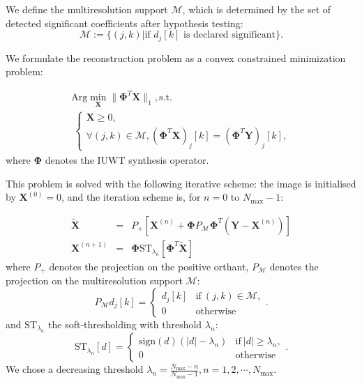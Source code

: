 We define the multiresolution support $\mathcal{M}$, which is determined by the set of detected significant coefficients after hypothesis testing:
\begin{equation}
\label{eq33}
\mathcal{M} := \{ (j,k) | \text{if } d_j[k] \text{ is declared significant} \} .
\end{equation}

We formulate the reconstruction problem as a convex constrained minimization problem:

\begin{equation}
\label{eq34}
\begin{split}
\text{Arg} \min_{\mathbf{X}} \| \mathbf{ \Phi}^{T}\mathbf{X}\|_1,
\text{s.t.} \\ \: \left\{\begin{array}{c}\mathbf{X} \geqslant 0 , \\\forall (j,k)\in \mathcal{M},      (\mathbf{ \Phi}^{T}\mathbf{X})_j[k]=(\mathbf{ \Phi}^{T}\mathbf{Y})_j[k] , \end{array}\right.
\end{split}
\end{equation}
where $\mathbf{\Phi}$ denotes the IUWT synthesis operator.

This problem is solved with the following iterative scheme: the image is initialised by $\mathbf{X}^{(0)} = 0$, and the iteration scheme is, for $n=0$ to $N_{\max}-1$:


\begin{eqnarray}
\tilde{\mathbf{X}} &=& P_{+}[\mathbf{ X}^{(n)} + \mathbf{ \Phi} P_{\mathcal{M}} \mathbf{ \Phi}^{T} (\mathbf{ Y} - \mathbf{ X}^{(n)})] \\
\mathbf{X}^{(n+1)} &=& \mathbf{ \Phi}\text{ST}_{\lambda_n}[\mathbf{ \Phi}^{T}\tilde{\mathbf{X}}]
\end{eqnarray}
where $P_{+}$ denotes the projection on the positive orthant, $P_{\mathcal{M}}$ denotes the projection on the multiresolution support $\mathcal{M}$:
\begin{equation}
P_{\mathcal{M}}d_j[k] = \left\{\begin{array}{cc} d_j[k] & \text{if} \  (j,k) \in \mathcal{M} , \\0 & \text{otherwise} \end{array} . \right.
\end{equation}
and $\text{ST}_{\lambda_n}$ the soft-thresholding with threshold $\lambda_n$:
\begin{equation}
\text{ST}_{\lambda_n} [d] = \left\{\begin{array}{cc} \mathrm{sign}(d)(|d| - \lambda_n) & \text{if} \ |d| \geqslant \lambda_n , \\0 & \text{otherwise} \end{array} . \right.
\end{equation}
We chose a decreasing threshold $\lambda_n = \frac{N_{\max} - n}{N_{\max} - 1},n=1,2,\cdots,N_{\max}$.

